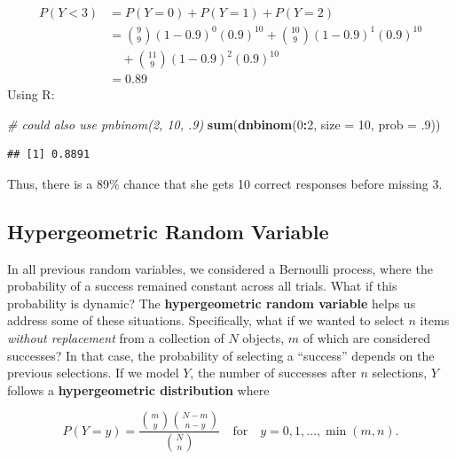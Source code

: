 \documentclass[
]{krantz}
\newenvironment{Shaded}{\begin{snugshade}}{\end{snugshade}}
\newcommand{\AttributeTok}[1]{\textcolor[rgb]{0.27,0.27,0.27}{#1}}
\newcommand{\CommentTok}[1]{\textcolor[rgb]{0.37,0.37,0.37}{\textit{#1}}}
\newcommand{\DecValTok}[1]{\textcolor[rgb]{0.06,0.06,0.06}{#1}}
\newcommand{\FunctionTok}[1]{\textcolor[rgb]{0.27,0.27,0.27}{\textbf{#1}}}
\newcommand{\NormalTok}[1]{#1}
\newcommand{\SpecialCharTok}[1]{\textcolor[rgb]{0.43,0.43,0.43}{\textbf{#1}}}
\begin{document}
\begin{align*}
 P(Y < 3) &= P(Y=0) + P(Y=1) + P(Y=2) \\
          &= \binom{9}{9}(1-0.9)^0 (0.9)^{10} + \binom{10}{9}(1-0.9)^1 (0.9)^{10} \\
          & \quad + \binom{11}{9}(1-0.9)^2 (0.9)^{10} \\
          &= 0.89
\end{align*}
Using R:

\begin{Shaded}
\begin{Highlighting}[]
\CommentTok{\# could also use pnbinom(2, 10, .9)}
\FunctionTok{sum}\NormalTok{(}\FunctionTok{dnbinom}\NormalTok{(}\DecValTok{0}\SpecialCharTok{:}\DecValTok{2}\NormalTok{, }\AttributeTok{size =} \DecValTok{10}\NormalTok{, }\AttributeTok{prob =}\NormalTok{ .}\DecValTok{9}\NormalTok{))  }
\end{Highlighting}
\end{Shaded}

\begin{verbatim}
## [1] 0.8891
\end{verbatim}

Thus, there is a 89\% chance that she gets 10 correct responses before missing 3.

\subsection{Hypergeometric Random Variable}\label{hypergeometric-random-variable}

In all previous random variables, we considered a Bernoulli process, where the probability of a success remained constant across all trials. What if this probability is dynamic? The \textbf{hypergeometric random variable} helps us address some of these situations. Specifically, what if we wanted to select \(n\) items \emph{without replacement} from a collection of \(N\) objects, \(m\) of which are considered successes? In that case, the probability of selecting a ``success'' depends on the previous selections.
If we model \(Y\), the number of successes after \(n\) selections, \(Y\) follows a \textbf{hypergeometric distribution}  where

\begin{equation}
P(Y=y) = \frac{\binom{m}{y} \binom{N-m}{n-y}}{\binom{N}{n}} \quad \textrm{for} \quad y = 0, 1, \ldots, \min(m,n).
\label{eq:hyperGeoRV}
\end{equation}
\end{document}
